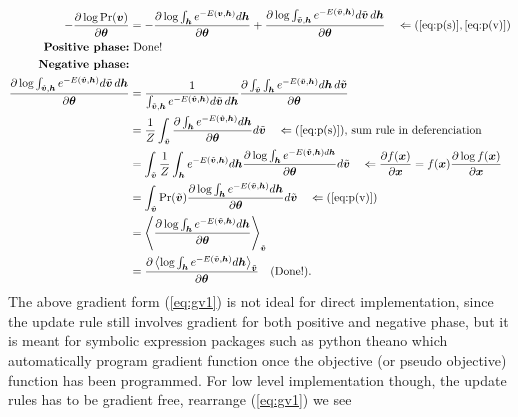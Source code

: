 \documentclass[11pt]{article}
\newcommand{\mean}[2]{\left\langle{#1}\right\rangle_{#2}}
\newcommand{\vh}{\boldsymbol{h}}
\newcommand{\vv}{\boldsymbol{v}}
\newcommand{\vx}{\boldsymbol{x}}
\newcommand{\vvt}{\tilde{\vv}}
\newcommand{\pEC}{\boldsymbol{\theta}}
\newcommand{\PDV}[2]{\frac{\partial #1}{\partial #2}}
\begin{document}
\begin{align*}
  -\PDV{\log{\Pr(\vv)}}{\pEC}
  & = -\PDV{\log{\int_{\vh}{e^{-E(\vv, \vh)}d\vh}}}{\pEC} + \PDV{\log{\int_{\vvt, \vh} e^{-E(\vvt, \vh)} d\vvt\,d\vh }}{\pEC} \quad \Leftarrow (\ref{eq:p(s)}, \ref{eq:p(v)}) \\
  \textrm{\textbf{Positive phase:}} & \textrm{ Done!} \\
  \textrm{\textbf{Negative phase:}} \\
  \PDV{\log{\int_{\vvt, \vh} e^{-E(\vvt, \vh)} d\vvt\,d\vh }}{\pEC}
  & = \frac{1}{\int_{\vvt, \vh} e^{-E(\vvt, \vh)} d\vvt\,d\vh} \PDV{\int_{\vvt}\int_{\vh} e^{-E(\vvt, \vh)} d\vh\,d\vvt}{\pEC} \\
  & = \frac{1}{Z} \int_{\vvt} \PDV{ \int_{\vh}{e^{-E(\vvt, \vh)}}d\vh }{ \pEC } d\vvt \quad \Leftarrow (\ref{eq:p(s)}),\,\textrm{sum rule in deferenciation} \\
  & = \int_{\vvt}  \frac{1}{Z}\int_{\vh} e^{-E(\vvt, \vh)} d\vh \PDV{\log{\int_{\vh} e^{-E(\vvt, \vh) d\vh}}}{\pEC}  d\vvt \quad \Leftarrow \PDV{f(\vx)}{\vx}=f(\vx)\PDV{\log{f(\vx)}}{\vx} \\
  & = \int_{\vvt}{\Pr(\vvt) \PDV{\log{\int_{\vh}{e^{-E(\vvt, \vh)}d\vh}}}{\pEC}}d\vvt \quad \Leftarrow (\ref{eq:p(v)}) \\
  & = \mean{\PDV{\log{\int_{\vh}{e^{-E(\vvt, \vh)}d\vh}}}{\pEC}}{\vvt} \\
  & = \PDV{\mean{\log{\int_{\vh}{e^{-E(\vvt, \vh)}d\vh}}}{\vvt}}{\pEC} \quad (\textrm{Done!}).
\end{align*}
The above gradient form (\ref{eq:gv1}) is not ideal for direct implementation, since the update rule still involves gradient for both positive and negative phase, but it is meant for symbolic expression packages such as python theano which automatically program gradient function once the objective (or pseudo objective) function has been programmed. For low level implementation though, the update rules has to be gradient free, rearrange (\ref{eq:gv1}) we see
\end{document}
